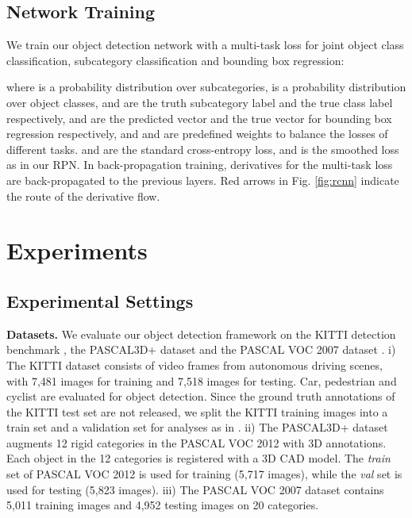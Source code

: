 \documentclass[10pt,twocolumn,letterpaper]{article}
\begin{document}
\subsection{Network Training}

We train our object detection network with a multi-task loss for joint object class classification, subcategory classification and bounding box regression:

where  is a probability distribution over  subcategories,  is a probability distribution over  object classes,  and  are the truth subcategory label and the true class label respectively,  and  are the predicted vector and the true vector for bounding box regression respectively, and  and  are predefined weights to balance the losses of different tasks.  and  are the standard cross-entropy loss, and  is the smoothed  loss as in our RPN. In back-propagation training, derivatives for the multi-task loss are back-propagated to the previous layers. Red arrows in Fig. \ref{fig:rcnn} indicate the route of the derivative flow.

\section{Experiments} \label{sec:exp}

\subsection{Experimental Settings}
	
\noindent \textbf{Datasets.} We evaluate our object detection framework on the KITTI detection benchmark \cite{geiger2012we}, the PASCAL3D+ dataset \cite{xiang2014beyond} and the PASCAL VOC 2007 dataset \cite{Everingham10}. i) The KITTI dataset consists of video frames from autonomous driving scenes, with 7,481 images for training and 7,518 images for testing. Car, pedestrian and cyclist are evaluated for object detection. Since the ground truth annotations of the KITTI test set are not released, we split the KITTI training images into a train set and a validation set for analyses as in \cite{xiang2015data}. ii) The PASCAL3D+ dataset augments 12 rigid categories in the PASCAL VOC 2012 \cite{pascal-voc-2012} with 3D annotations. Each object in the 12 categories is registered with a 3D CAD model. The \emph{train} set of PASCAL VOC 2012 is used for training (5,717 images), while the \emph{val} set is used for testing (5,823 images). iii) The PASCAL VOC 2007 dataset \cite{Everingham10} contains 5,011 training images and 4,952 testing images on 20 categories.
\end{document}

